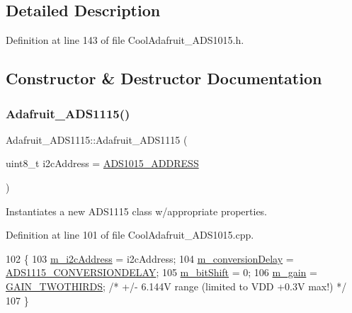 \subsection{Detailed Description}


Definition at line 143 of file Cool\+Adafruit\+\_\+\+A\+D\+S1015.\+h.



\subsection{Constructor \& Destructor Documentation}
\mbox{\label{class_adafruit___a_d_s1115_a7058cf2c75b673fb0b0a8936c3edd1fd}} 
\subsubsection{\texorpdfstring{Adafruit\+\_\+\+A\+D\+S1115()}{Adafruit\_ADS1115()}}
{\footnotesize\ttfamily Adafruit\+\_\+\+A\+D\+S1115\+::\+Adafruit\+\_\+\+A\+D\+S1115 (\begin{DoxyParamCaption}\item[{uint8\+\_\+t}]{i2c\+Address = {\ttfamily \hyperlink{_cool_adafruit___a_d_s1015_8h_ae55d158023984e8f0ddc80b58d5b30dc}{A\+D\+S1015\+\_\+\+A\+D\+D\+R\+E\+SS}} }\end{DoxyParamCaption})}



Instantiates a new A\+D\+S1115 class w/appropriate properties. 



Definition at line 101 of file Cool\+Adafruit\+\_\+\+A\+D\+S1015.\+cpp.


\begin{DoxyCode}
102 \{
103    \hyperlink{class_adafruit___a_d_s1015_a2186993621a7973256d47f086c74035d}{m\_i2cAddress} = i2cAddress;
104    \hyperlink{class_adafruit___a_d_s1015_aa3a29a64a6705fce1fee21d73c642a0e}{m\_conversionDelay} = \hyperlink{_cool_adafruit___a_d_s1015_8h_a19058003b7ee8f55deb5492d9c3b6cb5}{ADS1115\_CONVERSIONDELAY};
105    \hyperlink{class_adafruit___a_d_s1015_ab238ce17112a78db2be4ea14d57fb114}{m\_bitShift} = 0;
106    \hyperlink{class_adafruit___a_d_s1015_a8db90fe03d55a18246984ba2ba5e7f32}{m\_gain} = \hyperlink{_cool_adafruit___a_d_s1015_8h_a3d6c0e15829a207b9155890811fa4781a879d688347ec0bf159fe1278db602f68}{GAIN\_TWOTHIRDS}; \textcolor{comment}{/* +/- 6.144V range (limited to VDD +0.3V max!) */}
107 \}
\end{DoxyCode}


